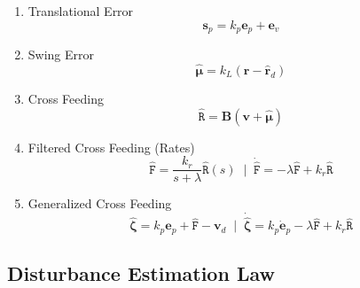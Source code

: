 \documentclass[12pt]{article}
\begin{document}
\begin{enumerate}
    \item Translational Error
          \begin{equation}
              \mathbf{s}_p = k_p\mathbf{e}_p + \mathbf{e}_v
          \end{equation}

    \item Swing Error
          \begin{equation}
              \hat{\boldsymbol{\mu}} = k_L\left(\mathbf{r} - \hat{\mathbf{r}}_d\right)
          \end{equation}

    \item Cross Feeding
          \begin{equation}
              \hat{\mathtt{R}} = \mathbf{B}\left(\mathbf{v} + \hat{\boldsymbol{\mu}}\right)
          \end{equation}

    \item Filtered Cross Feeding (Rates)
          \begin{equation}
              \hat{\mathtt{F}} = \frac{k_r}{s + \lambda}\hat{\mathtt{R}}(s) \; \mid \; \dot{\hat{\mathtt{F}}} = -\lambda\hat{\mathtt{F}} + k_r\hat{\mathtt{R}}
          \end{equation}

    \item Generalized Cross Feeding
          \begin{equation}
              \hat{\boldsymbol{\zeta}} = k_p\mathbf{e}_p + \hat{\mathtt{F}} - \mathbf{v}_d \;\mid\;\dot{\hat{\boldsymbol{\zeta}}} = k_p\dot{\mathbf{e}}_p - \lambda\hat{\mathtt{F}} + k_r\hat{\mathtt{R}}
          \end{equation}
\end{enumerate}

\subsection{Disturbance Estimation Law}
\end{document}
